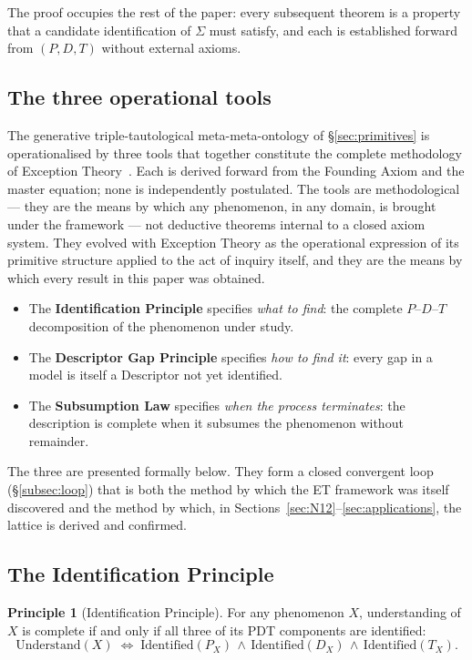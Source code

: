 \documentclass[11pt,a4paper]{article}
\theoremstyle{definition}
\newtheorem{principle}[theorem]{Principle}
\theoremstyle{remark}
\begin{document}
The proof occupies the rest of the paper: every subsequent theorem is a property that a candidate identification of $\Sigma$ must satisfy, and each is established forward from $(P,D,T)$ without external axioms.


\subsection{The three operational tools}\label{subsec:three-tools}

The generative triple-tautological meta-meta-ontology of \S\ref{sec:primitives} is operationalised by three tools that together constitute the complete methodology of Exception Theory~\cite{ThreeTools}. Each is derived forward from the Founding Axiom and the master equation; none is independently postulated. The tools are methodological --- they are the means by which any phenomenon, in any domain, is brought under the framework --- not deductive theorems internal to a closed axiom system. They evolved with Exception Theory as the operational expression of its primitive structure applied to the act of inquiry itself, and they are the means by which every result in this paper was obtained.

\begin{itemize}[leftmargin=*]
\item The \textbf{Identification Principle} specifies \emph{what to find}: the complete $P$--$D$--$T$ decomposition of the phenomenon under study.
\item The \textbf{Descriptor Gap Principle} specifies \emph{how to find it}: every gap in a model is itself a Descriptor not yet identified.
\item The \textbf{Subsumption Law} specifies \emph{when the process terminates}: the description is complete when it subsumes the phenomenon without remainder.
\end{itemize}

The three are presented formally below. They form a closed convergent loop (\S\ref{subsec:loop}) that is both the method by which the ET framework was itself discovered and the method by which, in Sections~\ref{sec:N12}--\ref{sec:applications}, the lattice is derived and confirmed.

\subsection{The Identification Principle}\label{subsec:identification}

\begin{principle}[Identification Principle]\label{princ:identification}
For any phenomenon $X$, understanding of $X$ is complete if and only if all three of its PDT components are identified:
\[
\boxed{\;\mathrm{Understand}(X) \;\iff\; \mathrm{Identified}(P_{X}) \,\land\, \mathrm{Identified}(D_{X}) \,\land\, \mathrm{Identified}(T_{X}).\;}
\]
\end{principle}
\end{document}
